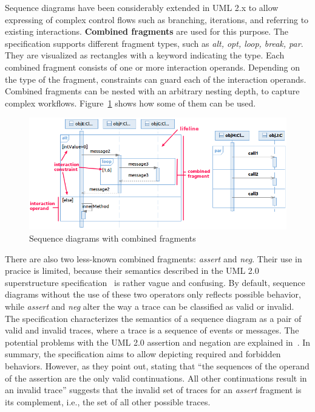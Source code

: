 \documentclass[letter]{llncs}
\begin{document}
Sequence diagrams have been considerably extended in UML 2.x to allow expressing of complex control 
flows such as branching, iterations, and referring to existing interactions.
\textbf{Combined fragments} are used for this purpose. The specification
supports different fragment types, such as \emph{alt, opt, loop, break, par}. They are
visualized as rectangles with a keyword indicating the type.
Each combined fragment consists of one or more interaction operands. Depending
on the type of the fragment, constraints can guard each of the interaction operands. 
Combined fragments can be nested with an arbitrary nesting
depth, to capture complex workflows. Figure~\ref{fig:SDExample} shows how some of them can be
used. 
\begin{figure}[!t]
\centering
\includegraphics[width=1.0\linewidth,keepaspectratio=true]{./Figure2_merged.png}
\caption{Sequence diagrams with combined fragments}
\label{fig:SDExample}
\end{figure}
There are also two less-known combined fragments: \emph{assert} and \emph{neg}. Their use in pracice
is limited, because their semantics described in the UML 2.0 superstructure specification~\cite{UML2.4_superstructure}
is rather vague and confusing. By default, sequence diagrams without the use of these two operators 
only reflects possible behavior, while \emph{assert} and \emph{neg} alter the way 
a trace can be classified as valid or invalid. The specification characterizes
the semantics of a sequence diagram as a pair of valid and invalid traces,
where a trace is a sequence of events or messages.
The potential problems with the UML 2.0 assertion and negation are explained in~\cite{Harel07assertand}.
In summary, the specification aims to allow depicting required and forbidden behaviors.
However, as they point out, stating that ``the sequences of the operand of the assertion are the only valid continuations. All other continuations result in an invalid trace''
suggests that the invalid set of traces for an \emph{assert} fragment is its complement, i.e., the set of all other possible traces.
\end{document}
